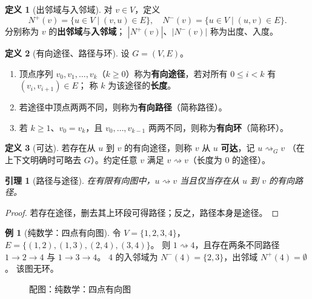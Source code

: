 \documentclass[UTF8,a4paper,11pt]{ctexart}
\theoremstyle{definition}
\newtheorem{definition}{定义}[section]
\newtheorem{example}{例}[section]
\theoremstyle{plain}
\newtheorem{lemma}{引理}[section]
\theoremstyle{remark}
\numberwithin{figure}{section}
\numberwithin{table}{section}
\begin{document}
\begin{definition}[出邻域与入邻域]
对 $v\in V$，定义
\[
N^+(v)=\{u\in V\mid (v,u)\in E\},
\quad
N^-(v)=\{u\in V\mid (u,v)\in E\}.
\]
分别称为 $v$ 的\textbf{出邻域}与\textbf{入邻域}；
$|N^+(v)|$、$|N^-(v)|$ 称为出度、入度。
\end{definition}

\begin{definition}[有向途径、路径与环]
设 $G=(V,E)$。
\begin{enumerate}
  \item 顶点序列 $v_0,v_1,\ldots,v_k$（$k\ge 0$）称为\textbf{有向途径}，若对所有 $0\le i<k$ 有 $(v_i,v_{i+1})\in E$；
        称 $k$ 为该途径的\textbf{长度}。
  \item 若途径中顶点两两不同，则称为\textbf{有向路径}（简称路径）。
  \item 若 $k\ge 1$、$v_0=v_k$，且 $v_0,\ldots,v_{k-1}$ 两两不同，则称为\textbf{有向环}（简称环）。
\end{enumerate}
\end{definition}

\begin{definition}[可达]
若存在从 $u$ 到 $v$ 的有向途径，则称 $v$ 从 $u$ \textbf{可达}，记 $u\rightsquigarrow_G v$
（在上下文明确时可略去 $G$）。约定任意 $v$ 满足 $v\rightsquigarrow v$（长度为 $0$ 的途径）。
\end{definition}

\begin{lemma}[路径与途径]
在有限有向图中，$u\rightsquigarrow v$ 当且仅当存在从 $u$ 到 $v$ 的有向路径。
\end{lemma}
\begin{proof}
若存在途径，删去其上环段可得路径；反之，路径本身是途径。
\end{proof}

\begin{example}[纯数学：四点有向图]
令 $V=\{1,2,3,4\}$，$E=\{(1,2),(1,3),(2,4),(3,4)\}$。
则 $1\rightsquigarrow 4$，且存在两条不同路径 $1\to2\to4$ 与 $1\to3\to4$。
$4$ 的入邻域为 $N^-(4)=\{2,3\}$，出邻域 $N^+(4)=\emptyset$。
该图无环。
\begin{figure}[H]
\centering
{}
\caption{配图：纯数学：四点有向图}
\label{fig:auto-03}
\end{figure}
\end{example}
\end{document}
